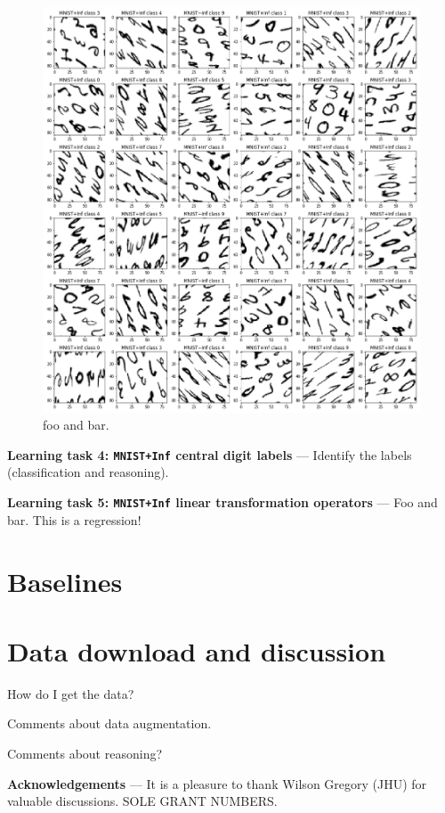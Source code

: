 \documentclass{article}
\renewcommand{\paragraph}[1]{\par\medskip\noindent\textbf{#1} ---}
\begin{document}
\begin{figure}[t!]
\includegraphics[width=\textwidth]{../notebooks/MNIST+Inf.png}
\caption{foo and bar.\label{fig:Inf}}
\end{figure}

\paragraph{Learning task 4: \texttt{MNIST+Inf} central digit labels}
Identify the labels (classification and reasoning).

\paragraph{Learning task 5: \texttt{MNIST+Inf} linear transformation operators}
Foo and bar. This is a regression!

\section{Baselines}

\section{Data download and discussion}

How do I get the data?

Comments about data augmentation.

Comments about reasoning?

\paragraph{Acknowledgements}
It is a pleasure to thank
  Wilson Gregory (JHU)
for valuable discussions.
SOLE GRANT NUMBERS.


\raggedright

\end{document}
